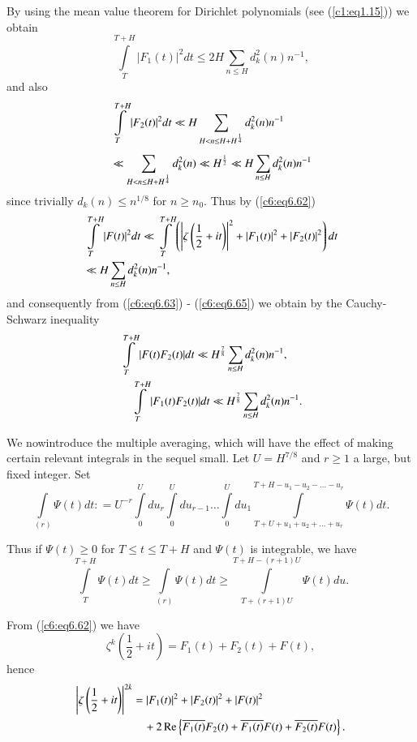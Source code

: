 By using the mean value theorem for Dirichlet polynomials (see
(\ref{c1:eq1.15})) we obtain 
\begin{equation}
\int\limits^{T+H}_T |F_1(t)|^2 dt \leq 2 H \sum\limits_{n \leq H}
d^2_k (n) n^{-1},\label{c6:eq6.64} 
\end{equation}
and also
\begin{align}
& \int\limits^{T+H}_T |F_2(t)|^2  dt  \ll H\sum\limits_{H < n \leq H +
    H^{\frac{1}{4}}} d^2_k(n) n^{-1}\label{c6:eq6.65}\\[5pt] 
& \ll \sum\limits_{H < n \leq H + H^{\frac{1}{4}}} d^2_k(n) \ll
  H^{\frac{1}{2}} \ll H \sum\limits_{n \leq H} d^2_k (n) n^{-1}\notag 
\end{align}
since trivially $d_k(n) \leq n^{1/8}$ for $n \geq n_0$. Thus by
(\ref{c6:eq6.62}) 
\begin{align}
& \int\limits^{T + H}_T |F(t)|^2 dt \ll \int\limits^{T+H}_T
  \left(\left|\zeta \left(\frac{1}{2} + it \right)\right|^2 +
  |F_1(t)|^2 + |F_2(t)|^2 \right) dt\label{c6:eq6.66}\\ 
& \ll H \sum\limits_{n \leq H} d^2_k (n) n^{-1},\notag 
\end{align}
and consequently from (\ref{c6:eq6.63}) - (\ref{c6:eq6.65}) we obtain
by the Cauchy-Schwarz inequality 
\begin{align}
& \int\limits^{T+H}_T |F(t) F_2(t)| dt \ll H^{\frac{7}{8}}
  \sum\limits_{n \leq H} d^2_k (n) n^{-1},\label{c6:eq6.67}\\ 
& \quad \int\limits^{T+H}_T |F_1(t)F_2(t)| dt  \ll H^{\frac{7}{8}}
  \sum\limits_{n\leq H} d^2_k(n) n^{-1}.\notag  
\end{align}

We now\pageoriginale introduce the multiple averaging, which will have
the effect of making certain relevant integrals in the sequel
small. Let  $U=H^{7/8}$ and $r \geq 1$ a large, but fixed integer. Set 
$$
\int\limits_{(r)} \Psi (t) dt: = U^{-r} \int\limits^U_0 du_r
\int\limits^U_0 du_{r-1} \ldots \int\limits^U_0 du_1
\int\limits^{T+H-u_1 -u_2 - \ldots - u_r}_{T + U + u_1 + u_2 + \ldots
  + u_r} \Psi (t) dt.  
$$

Thus if $\Psi (t) \geq 0$ for $T \leq t \leq T + H$ and $\Psi (t)$ is
integrable, we have 
\begin{equation}
\int\limits^{T+H}_T \Psi (t) dt \geq \int\limits_{(r)} \Psi (t) dt
\geq \int\limits^{T+H-(r+1)U}_{T+(r+1)U} \Psi(t)
du.\label{c6:eq6.68} 
\end{equation}

From (\ref{c6:eq6.62}) we have 
$$
\zeta^k \left(\frac{1}{2} + it \right) = F_1(t) + F_2(t) + F(t), 
$$
hence
\begin{align*}
\left|\zeta \left(\frac{1}{2}+ it \right)\right|^{2k} & = |F_1 (t)|^2
+ |F_2 (t)|^2 + |F(t)|^2\\ 
&\quad + 2 \operatorname{Re} \left\{ \overline{F_1(t)} F_2(t) + \overline{F_1(t)}
F(t) + \overline{F_2(t)} F(t) \right\}. 
\end{align*}

